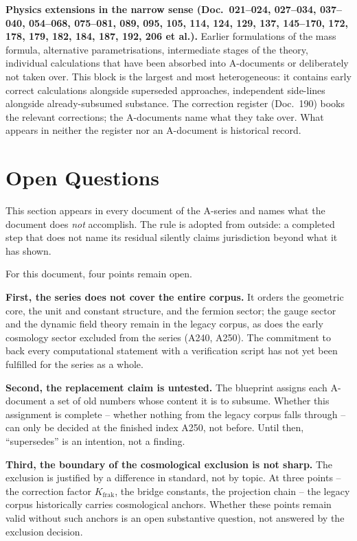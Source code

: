 \textbf{Physics extensions in the narrow sense (Doc.~021--024, 027--034,
037--040, 054--068, 075--081, 089, 095, 105, 114, 124, 129, 137, 145--170,
172, 178, 179, 182, 184, 187, 192, 206 et al.).} Earlier formulations of the mass
formula, alternative parametrisations, intermediate stages of the theory, individual
calculations that have been absorbed into A-documents or deliberately not taken over.
This block is the largest and most heterogeneous: it contains early correct
calculations alongside superseded approaches, independent side-lines alongside
already-subsumed substance. The correction register (Doc.~190) books the relevant
corrections; the A-documents name what they take over. What appears in neither the
register nor an A-document is historical record.


\section{Open Questions}

This section appears in every document of the A-series and names what the
document does \emph{not} accomplish. The rule is adopted from outside: a
completed step that does not name its residual silently claims jurisdiction
beyond what it has shown.

For this document, four points remain open.

\textbf{First, the series does not cover the entire corpus.} It orders the
geometric core, the unit and constant structure, and the fermion sector;
the gauge sector and the dynamic field theory remain in the legacy corpus,
as does the early cosmology sector excluded from the series (A240, A250).
The commitment to back every computational statement with a verification
script has not yet been fulfilled for the series as a whole.

\textbf{Second, the replacement claim is untested.} The blueprint assigns
each A-document a set of old numbers whose content it is to subsume. Whether
this assignment is complete -- whether nothing from the legacy corpus falls
through -- can only be decided at the finished index A250, not before. Until
then, ``supersedes'' is an intention, not a finding.

\textbf{Third, the boundary of the cosmological exclusion is not sharp.} The
exclusion is justified by a difference in standard, not by topic. At three
points -- the correction factor $K_\text{frak}$, the bridge constants, the
projection chain -- the legacy corpus historically carries cosmological
anchors. Whether these points remain valid without such anchors is an open
substantive question, not answered by the exclusion decision.

